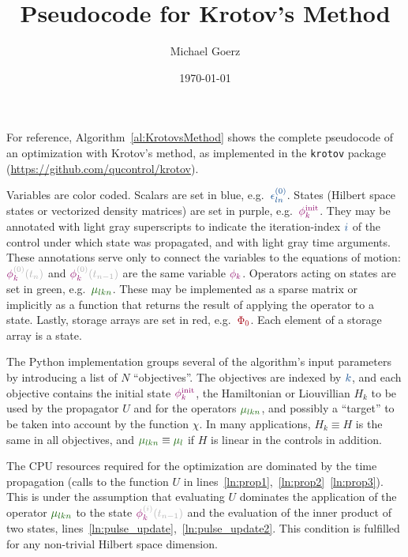 \documentclass[aps,pra,twocolumn,notitlepage,letterpaper]{revtex4}
\def\Author{Michael Goerz}
\def\Title{Pseudocode for Krotov's Method}
\newcommand{\VarScalar}[1]{{\color{clVarScalar}#1}}
\newcommand{\VarState}[1]{\ensuremath{\textcolor{clVarState}{#1}}}
\newcommand{\PropAnnotation}[1]{\textcolor{black!30}{#1}}
\newcommand{\VarPropState}[4]{\ensuremath{\VarState{#1}_{\textcolor{clVarState}{#2}}^{\PropAnnotation{#3}}\PropAnnotation{(#4)}}}  %
\newcommand{\VarOperator}[2]{{\color{clVarOperator}#1_{#2}}} %
\newcommand{\VarArray}[1]{{\color{clVarArray}#1}}
\begin{document}
\title{\Title}
\author{\Author}
\date{\today}

\maketitle

For reference, Algorithm~\ref{al:KrotovsMethod} shows the complete pseudocode of
an optimization with Krotov's method, as implemented in the
\texttt{krotov} package (\url{https://github.com/qucontrol/krotov}).

Variables are color coded.
Scalars are set in blue, e.g.\ $\VarScalar{\epsilon_{ln}^{(0)}}$.
States  (Hilbert space states or vectorized density matrices) are set in purple,
e.g.\ $\VarState{\phi_k^{\text{init}}}$.
They may be annotated with light gray superscripts to indicate the
iteration-index $\VarScalar{i}$ of the control under which state was propagated,
and with light gray time arguments.
These annotations serve only to connect the variables to the equations of
motion: $\VarPropState{\phi}{k}{(0)}{t_n}$ and
$\VarPropState{\phi}{k}{(0)}{t_{n-1}}$ are the same variable
$\VarState{\phi_k}$.
Operators acting on states are set in green, e.g.\ $\VarOperator{\mu}{lkn}$.
These may be implemented as a sparse matrix or implicitly as a function that
returns the result of applying the operator to a state.
Lastly, storage arrays are set in red, e.g.\ $\VarArray{\Phi_0}$.
Each element of a storage array is a state.

The Python implementation groups several of the algorithm's input parameters by
introducing a list of $N$ ``objectives''.
The objectives are indexed by $\VarScalar{k}$, and each objective contains the
initial state $\VarState{\phi_k^{\text{init}}}$, the Hamiltonian or Liouvillian
$H_k$ to be used by the propagator $U$ and for the operators
$\VarOperator{\mu}{lkn}$, and possibly a ``target'' to be taken into account by
the function $\chi$.
In many applications, $H_k \equiv H$ is the same in all objectives, and
$\VarOperator{\mu}{lkn} \equiv \VarOperator{\mu}{l}$ if $H$ is linear in the
controls in addition.

The CPU resources required for the optimization are dominated by the time
propagation (calls to the function $U$ in
lines~\ref{ln:prop1},~\ref{ln:prop2}~\ref{ln:prop3}). This is under the
assumption that evaluating $U$ dominates the application of the operator
$\VarOperator{\mu}{lkn}$ to the state $\VarPropState{\phi}{k}{(i)}{t_{n-1}}$ and
the evaluation of the inner product of two states,
lines~\ref{ln:pulse_update},~\ref{ln:pulse_update2}.
This condition is fulfilled for any non-trivial Hilbert space dimension.
\end{document}
